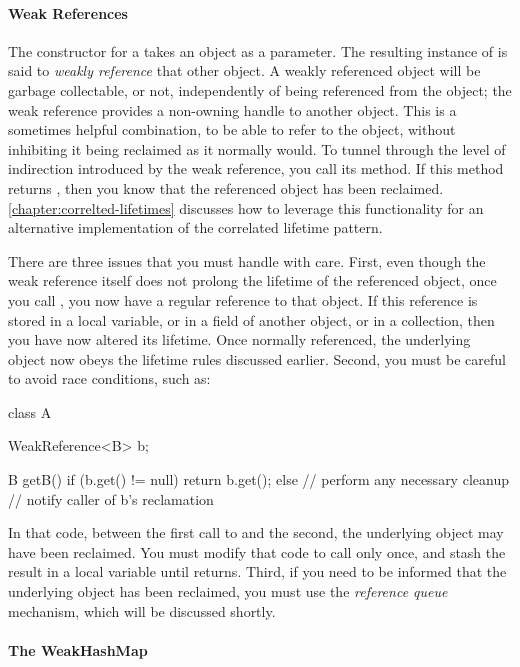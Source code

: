 \paragraph{Weak References}
The constructor for a  takes an object as a parameter. The
resulting instance of  is said to \emph{weakly reference}
that other object. A weakly referenced object will be garbage collectable, or
not, independently of being referenced from the  object; the
weak reference provides a non-owning handle to another object. This is a
sometimes helpful combination, to be able to refer to the object, without
inhibiting it being reclaimed as it normally would. To tunnel through the level
of indirection introduced by the weak reference, you call its  method.
If this method returns , then you know that the referenced object has
been reclaimed. \autoref{chapter:correlted-lifetimes} discusses how to leverage
this functionality for an alternative implementation of the correlated lifetime
pattern.

There are three issues that you must handle with care. First, even though the
weak reference itself does not prolong the lifetime of the referenced object,
once you call , you now have a regular reference to that object. If
this reference is stored in a local variable, or in a field of another object, or
in a collection, then you have now altered its lifetime. Once normally
referenced, the underlying object now obeys the lifetime rules discussed earlier.
Second, you must be careful to avoid race conditions, such as:
\begin{shortlisting}
class A {
   WeakReference<B> b;
   
   B getB() {
      if (b.get() != null) {
         return b.get();
      } else {
         // perform any necessary cleanup
         // notify caller of b's reclamation
      }
   }
}
\end{shortlisting}
In that code, between the first call to  and the second, the
underlying object may have been reclaimed. You must modify that code to call
 only once, and stash the result in a local variable until
 returns. Third, if you need to be informed that the underlying object
has been reclaimed, you must use the \emph{reference queue} mechanism, which will
be discussed shortly.

\paragraph{The WeakHashMap}
\label{sec:weakhashmap}

